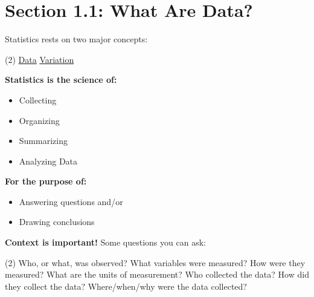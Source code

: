\documentclass[../mathNotesPreamble]{subfiles}
\begin{document}
  \section{Section 1.1: What Are Data?}
    Statistics rests on two major concepts:
    \begin{tasks}(2)
      \task \underline{Data}
      \task \underline{Variation}
    \end{tasks}

    \begin{minipage}[t]{0.5\linewidth}
      \textbf{Statistics is the science of:}
      \begin{itemize}
        \item Collecting
        \item Organizing
        \item Summarizing
        \item Analyzing Data
      \end{itemize}
    \end{minipage}%
    \begin{minipage}[t]{0.5\linewidth}
      \textbf{For the purpose of:}
      \begin{itemize}
        \item Answering questions and/or
        \item Drawing conclusions
      \end{itemize}
    \end{minipage}
    \vspace*{\baselineskip}

    \textbf{Context is important!} Some questions you can ask:
    \begin{tasks}[label=\textbullet](2)
      \task Who, or what, was observed?
      \task What variables were measured?
      \task How were they measured?
      \task What are the units of measurement?
      \task Who collected the data?
      \task How did they collect the data?
      \task* Where/when/why were the data collected?
    \end{tasks}
\end{document}
